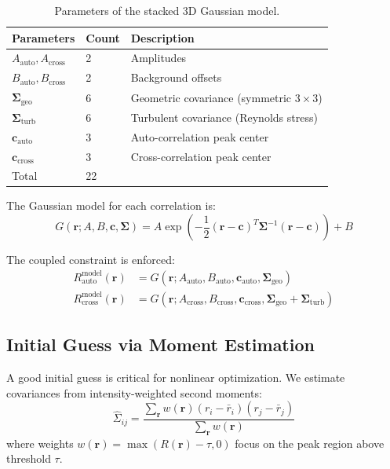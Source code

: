 \documentclass[11pt,a4paper]{article}
\begin{document}
\begin{table}[h]
\centering
\begin{tabular}{@{}lll@{}}
\toprule
Parameters & Count & Description \\
\midrule
$A_{\text{auto}}, A_{\text{cross}}$ & 2 & Amplitudes \\
$B_{\text{auto}}, B_{\text{cross}}$ & 2 & Background offsets \\
$\bm{\Sigma}_{\text{geo}}$ & 6 & Geometric covariance (symmetric $3\times3$) \\
$\bm{\Sigma}_{\text{turb}}$ & 6 & Turbulent covariance (Reynolds stress) \\
$\mathbf{c}_{\text{auto}}$ & 3 & Auto-correlation peak center \\
$\mathbf{c}_{\text{cross}}$ & 3 & Cross-correlation peak center \\
\midrule
Total & 22 & \\
\bottomrule
\end{tabular}
\caption{Parameters of the stacked 3D Gaussian model.}
\end{table}

The Gaussian model for each correlation is:
\begin{equation}
    G(\mathbf{r}; A, B, \mathbf{c}, \bm{\Sigma}) = A \exp\left(-\frac{1}{2}(\mathbf{r} - \mathbf{c})^T \bm{\Sigma}^{-1} (\mathbf{r} - \mathbf{c})\right) + B
\end{equation}

The coupled constraint is enforced:
\begin{align}
    R_{\text{auto}}^{\text{model}}(\mathbf{r}) &= G(\mathbf{r}; A_{\text{auto}}, B_{\text{auto}}, \mathbf{c}_{\text{auto}}, \bm{\Sigma}_{\text{geo}}) \\
    R_{\text{cross}}^{\text{model}}(\mathbf{r}) &= G(\mathbf{r}; A_{\text{cross}}, B_{\text{cross}}, \mathbf{c}_{\text{cross}}, \bm{\Sigma}_{\text{geo}} + \bm{\Sigma}_{\text{turb}})
\end{align}

\subsection{Initial Guess via Moment Estimation}

A good initial guess is critical for nonlinear optimization. We estimate covariances from intensity-weighted second moments:
\begin{equation}
    \hat{\Sigma}_{ij} = \frac{\sum_{\mathbf{r}} w(\mathbf{r}) (r_i - \bar{r}_i)(r_j - \bar{r}_j)}{\sum_{\mathbf{r}} w(\mathbf{r})}
\end{equation}
where weights $w(\mathbf{r}) = \max(R(\mathbf{r}) - \tau, 0)$ focus on the peak region above threshold $\tau$.
\end{document}
